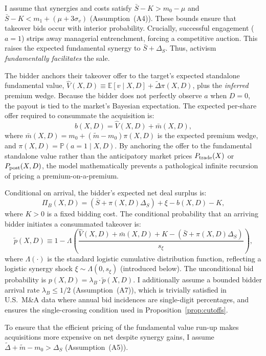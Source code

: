 \documentclass[11pt]{article}
\newcommand{\E}{\mathbb{E}}
\newcommand{\PP}{\mathbb{P}}
\newcommand{\1}{\mathbf{1}}
\begin{document}
I assume that synergies and costs satisfy $\bar{S}-K > m_0-\mu$ and $\bar{S}-K < m_1+(\mu+3\sigma_v)$ (Assumption~\textup{(A4)}). These bounds ensure that takeover bids occur with interior probability. Crucially, successful engagement ($a=1$) strips away managerial entrenchment, forcing a competitive auction. This raises the expected fundamental synergy to $\bar{S} + \Delta_S$. Thus, activism \emph{fundamentally facilitates} the sale.

The bidder anchors their takeover offer to the target's expected standalone fundamental value, $\hat{V}(X,D) \equiv \E[v \mid X,D] + \tilde{\Delta}\pi(X,D)$, plus the \emph{inferred} premium wedge. Because the bidder does not perfectly observe $a$ when $D=0$, the payout is tied to the market's Bayesian expectation. The expected per-share offer required to consummate the acquisition is:
\[
b(X,D) = \hat{V}(X,D) + \bar{m}(X,D),
\]
where $\bar{m}(X,D) = m_0 + (\tilde{m}-m_0)\pi(X,D)$ is the expected premium wedge, and $\pi(X,D) = \PP(a=1 \mid X,D)$. By anchoring the offer to the fundamental standalone value rather than the anticipatory market prices $P_{\textup{trade}}(X)$ or $P_{\textup{post}}(X,D)$, the model mathematically prevents a pathological infinite recursion of pricing a premium-on-a-premium.

Conditional on arrival, the bidder's expected net deal surplus is:
\[
\Pi_B(X,D) = (\bar{S} + \pi(X,D)\Delta_S) + \xi - b(X,D) - K,
\]
where $K > 0$ is a fixed bidding cost. The conditional probability that an arriving bidder initiates a consummated takeover is:
\begin{equation}
\tilde{p}(X,D) \equiv 1 - \Lambda\left(\frac{\hat{V}(X,D) + \bar{m}(X,D) + K - (\bar{S} + \pi(X,D)\Delta_S)}{s_\xi}\right),
\label{eq:bid-prob}
\end{equation}
where $\Lambda(\cdot)$ is the standard logistic cumulative distribution function, reflecting a logistic synergy shock $\xi \sim \Lambda(0, s_\xi)$ (introduced below). The unconditional bid probability is $p(X,D) = \lambda_B \cdot \tilde{p}(X,D)$. I additionally assume a bounded bidder arrival rate $\lambda_B \leq 1/2$ (Assumption~\textup{(A7)}), which is trivially satisfied in U.S.\ M\&A data where annual bid incidences are single-digit percentages, and ensures the single-crossing condition used in Proposition~\ref{prop:cutoffs}.

To ensure that the efficient pricing of the fundamental value run-up makes acquisitions more expensive on net despite synergy gains, I assume $\tilde{\Delta} + \tilde{m} - m_0 > \Delta_S$ (Assumption~\textup{(A5)}).
\end{document}
